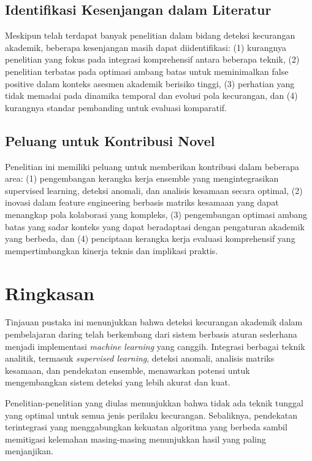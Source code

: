 \subsection{Identifikasi Kesenjangan dalam Literatur}

Meskipun telah terdapat banyak penelitian dalam bidang deteksi kecurangan akademik, beberapa kesenjangan masih dapat diidentifikasi: (1) kurangnya penelitian yang fokus pada integrasi komprehensif antara beberapa teknik, (2) penelitian terbatas pada optimasi ambang batas untuk meminimalkan false positive dalam konteks asesmen akademik berisiko tinggi, (3) perhatian yang tidak memadai pada dinamika temporal dan evolusi pola kecurangan, dan (4) kurangnya standar pembanding untuk evaluasi komparatif.

\subsection{Peluang untuk Kontribusi Novel}

Penelitian ini memiliki peluang untuk memberikan kontribusi dalam beberapa area: (1) pengembangan kerangka kerja ensemble yang mengintegrasikan supervised learning, deteksi anomali, dan analisis kesamaan secara optimal, (2) inovasi dalam feature engineering berbasis matriks kesamaan yang dapat menangkap pola kolaborasi yang kompleks, (3) pengembangan optimasi ambang batas yang sadar konteks yang dapat beradaptasi dengan pengaturan akademik yang berbeda, dan (4) penciptaan kerangka kerja evaluasi komprehensif yang mempertimbangkan kinerja teknis dan implikasi praktis.

\section{Ringkasan}
\label{sec:ringkasanBab2}

Tinjauan pustaka ini menunjukkan bahwa deteksi kecurangan akademik dalam pembelajaran daring telah berkembang dari sistem berbasis aturan sederhana menjadi implementasi \textit{machine learning} yang canggih. Integrasi berbagai teknik analitik, termasuk \textit{supervised learning}, deteksi anomali, analisis matriks kesamaan, dan pendekatan ensemble, menawarkan potensi untuk mengembangkan sistem deteksi yang lebih akurat dan kuat.

Penelitian-penelitian yang diulas menunjukkan bahwa tidak ada teknik tunggal yang optimal untuk semua jenis perilaku kecurangan. Sebaliknya, pendekatan terintegrasi yang menggabungkan kekuatan algoritma yang berbeda sambil memitigasi kelemahan masing-masing menunjukkan hasil yang paling menjanjikan.

